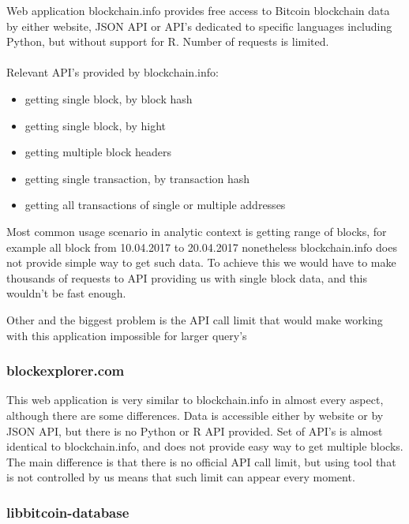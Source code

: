 \documentclass[12pt, en, eng]{mgr}
\begin{document}
Web application blockchain.info provides free access to Bitcoin blockchain data by either website, JSON API or API's dedicated to specific languages including Python, but without support for R. Number of requests is limited.
\\
\\
Relevant API's provided by blockchain.info:
\begin{itemize}
\item
getting single block, by block hash
\item
getting single block, by hight
\item
getting multiple block headers
\item
getting single transaction, by transaction hash
\item
getting all transactions of single or multiple addresses


\end{itemize}

Most common usage scenario in analytic context is getting range of blocks, for example all block from 10.04.2017 to 20.04.2017 nonetheless blockchain.info does not provide simple way to get such data. To achieve this we would have to make thousands of requests to API providing us with single block data, and this wouldn't be fast enough.

Other and the biggest problem is the API call limit that would make working with this application impossible for larger query's

\subsubsection*{blockexplorer.com}

This web application is very similar to blockchain.info in almost every aspect, although there are some differences. Data is accessible either by website or by JSON API, but there is no Python or R API provided. Set of API's is almost identical to blockchain.info, and does not provide easy way to get multiple blocks. The main difference is that there is no official API call limit, but using tool that is not controlled by us means that such limit can appear every moment.

\subsubsection*{libbitcoin-database}
\end{document}
